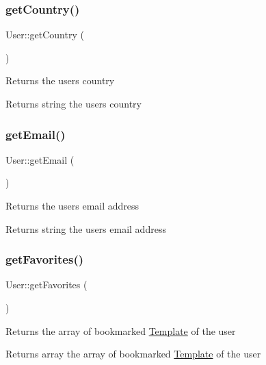 \subsubsection{\texorpdfstring{get\+Country()}{getCountry()}}
{\footnotesize\ttfamily User\+::get\+Country (\begin{DoxyParamCaption}{ }\end{DoxyParamCaption})}

Returns the user\textquotesingle{}s country \begin{DoxyReturn}{Returns}
string the user\textquotesingle{}s country 
\end{DoxyReturn}
\mbox{\label{classUser_acf082b95b344df14b9e8a6c09868dbcd}} 
\subsubsection{\texorpdfstring{get\+Email()}{getEmail()}}
{\footnotesize\ttfamily User\+::get\+Email (\begin{DoxyParamCaption}{ }\end{DoxyParamCaption})}

Returns the user\textquotesingle{}s email address \begin{DoxyReturn}{Returns}
string the user\textquotesingle{}s email address 
\end{DoxyReturn}
\mbox{\label{classUser_ad2d88cd0c79186c35350c65b0f036994}} 
\subsubsection{\texorpdfstring{get\+Favorites()}{getFavorites()}}
{\footnotesize\ttfamily User\+::get\+Favorites (\begin{DoxyParamCaption}{ }\end{DoxyParamCaption})}

Returns the array of bookmarked \hyperlink{classTemplate}{Template} of the user \begin{DoxyReturn}{Returns}
array the array of bookmarked \hyperlink{classTemplate}{Template} of the user 
\end{DoxyReturn}
\mbox{\label{classUser_a1797d3f80cc25452b4e97232ef14c6be}} 
